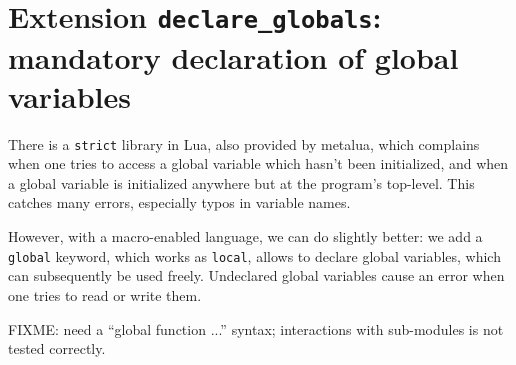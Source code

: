 \section{Extension {\tt declare\_globals}: mandatory declaration of global
  variables}
There is a {\tt strict} library in Lua, also provided by metalua, which
complains when one tries to access a global variable which hasn't been
initialized, and when a global variable is initialized anywhere but at the
program's top-level. This catches many errors, especially typos in variable
names. 

However, with a macro-enabled language, we can do slightly better: we add a {\tt
  global} keyword, which works as {\tt local}, allows to declare global
variables, which can subsequently be used freely. Undeclared global variables
cause an error when one tries to read or write them.

FIXME: need a ``global function ...'' syntax; interactions with sub-modules is
not tested correctly.

